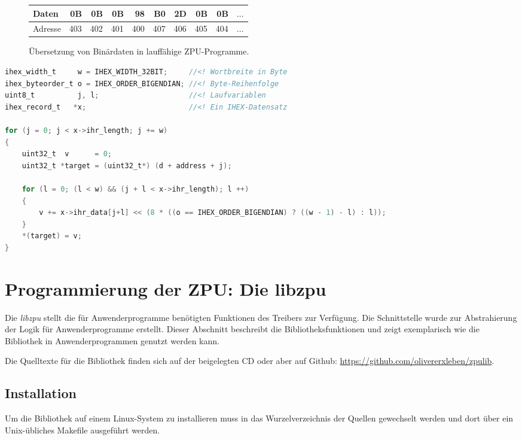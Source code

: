 \documentclass[11pt]{scrartcl}
\begin{document}
\begin{figure}
\begin{center}
\begin{tabular}{lrrrrrrrrc}
	\toprule
	Daten   &  0B &  0B &  0B &  98 &  B0 &  2D &  0B &  0B & $\ldots$ \\ \midrule
	Adresse & 403 & 402 & 401 & 400 & 407 & 406 & 405 & 404 & $\ldots$ \\ \bottomrule
\end{tabular}
\end{center}
\caption{Übersetzung von Binärdaten in lauffähige ZPU-Programme.}
\label{zpu_addresses}
\end{figure}

\begin{lstlisting}[float=p,language=C,caption=Algorithmus zum Laden eines Intel HEX-Datensatzes in den ZPU-Speicher,morekeywords={uint8_t, uint32_t, ihex_width_t, ihex_record_t, ihex_byteorder_t},label=ihex_copy_algo]
ihex_width_t     w = IHEX_WIDTH_32BIT;     //<! Wortbreite in Byte
ihex_byteorder_t o = IHEX_ORDER_BIGENDIAN; //<! Byte-Reihenfolge
uint8_t          j, l;                     //<! Laufvariablen
ihex_record_t   *x;                        //<! Ein IHEX-Datensatz

for (j = 0; j < x->ihr_length; j += w)
{
	uint32_t  v      = 0;
	uint32_t *target = (uint32_t*) (d + address + j);
					
	for (l = 0; (l < w) && (j + l < x->ihr_length); l ++)
	{
		v += x->ihr_data[j+l] << (8 * ((o == IHEX_ORDER_BIGENDIAN) ? ((w - 1) - l) : l));
	}
	*(target) = v;
}
\end{lstlisting}

\pagebreak
\section{Programmierung der ZPU: Die libzpu}
\label{chapter_libzpu}

Die \textit{libzpu} stellt die für Anwenderprogramme benötigten Funktionen des Treibers zur Verfügung. Die Schnittstelle wurde zur Abstrahierung der Logik für Anwenderprogramme erstellt. Dieser Abschnitt beschreibt die Bibliotheksfunktionen und zeigt exemplarisch wie die Bibliothek in Anwenderprogrammen genutzt werden kann. 

Die Quelltexte für die Bibliothek finden sich auf der beigelegten CD oder aber auf Github: \url{https://github.com/olivererxleben/zpulib}. 

\subsection{Installation}
Um die Bibliothek auf einem Linux-System zu installieren muss in das Wurzelverzeichnis der Quellen gewechselt werden und dort über ein Unix-übliches Makefile ausgeführt werden.
\end{document}
